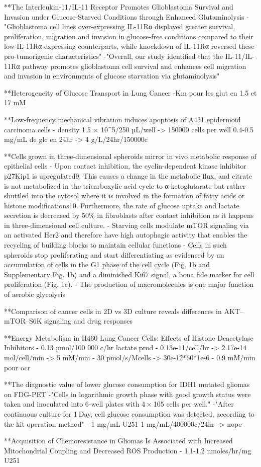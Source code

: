 \documentclass[11pt,a4paper]{article}
\begin{document}
**The Interleukin-11/IL-11 Receptor Promotes Glioblastoma Survival and Invasion under Glucose-Starved Conditions through Enhanced Glutaminolysis
-"Glioblastoma cell lines over-expressing IL-11Rα displayed greater survival, proliferation, migration and invasion in glucose-free conditions compared to their low-IL-11Rα-expressing counterparts, while knockdown of IL-11Rα reversed these pro-tumorigenic characteristics"
-"Overall, our study identified that the IL-11/IL-11Rα pathway promotes glioblastoma cell survival and enhances cell migration and invasion in environments of glucose starvation via glutaminolysis"

**Heterogeneity of Glucose Transport in Lung Cancer
-Km pour les glut en 1.5 et 17 mM

**Low‐frequency mechanical vibration induces apoptosis of A431 epidermoid carcinoma cells
- density 1.5 × 10^5/250 µL/well -> 150000 cells  per well 0.4-0.5 mg/mL de glc en 24hr -> 4 g/L/24hr/150000c

**Cells grown in three-dimensional spheroids mirror in vivo metabolic response of epithelial cells
- Upon contact inhibition, the cyclin-dependent kinase inhibitor p27Kip1 is upregulated9. This causes a change in the metabolic flux, and citrate is not metabolized in the tricarboxylic acid cycle to α-ketoglutarate but rather shuttled into the cytosol where it is involved in the formation of fatty acids or histone modifications10. Furthermore, the rate of glucose uptake and lactate secretion is decreased by 50\% in fibroblasts after contact inhibition as it happens in three-dimensional cell culture.
-  Starving cells modulate mTOR signaling via an activated Her2 and therefore have high autophagic activity that enables the recycling of building blocks to maintain cellular functions
- Cells in such spheroids stop proliferating and start differentiating as evidenced by an accumulation of cells in the G1 phase of the cell cycle (Fig. 1b and Supplementary Fig. 1b) and a diminished Ki67 signal, a bona fide marker for cell proliferation (Fig. 1c).
- The production of macromolecules is one major function of aerobic glycolysis

**Comparison of cancer cells in 2D vs 3D culture reveals differences in AKT–mTOR–S6K signaling and drug responses


**Energy Metabolism in H460 Lung Cancer Cells: Effects of Histone Deacetylase Inhibitors
- 0.13 µmol/100 000 c/hr lactate prod 
- 0.13e-11/cell/hr -> 2.17e-14 mol/cell/min -> 5 mM/min
- 30 pmol/s/Mcells -> 30e-12*60*1e-6
- 0.9 mM/min pour ocr

**The diagnostic value of lower glucose consumption for IDH1 mutated gliomas on FDG-PET
-"Cells in logarithmic growth phase with good growth status were taken and inoculated into 6-well plates with 4 × 105 cells per well."
-"After continuous culture for 1 Day, cell glucose consumption was detected, according to the kit operation method"
- 1 mg/mL U251  1 mg/mL/400000c/24hr -> nope

**Acquisition of Chemoresistance in Gliomas Is Associated with Increased Mitochondrial Coupling and Decreased ROS Production
- 1.1-1.2 nmoles/hr/mg U251
\end{document}
